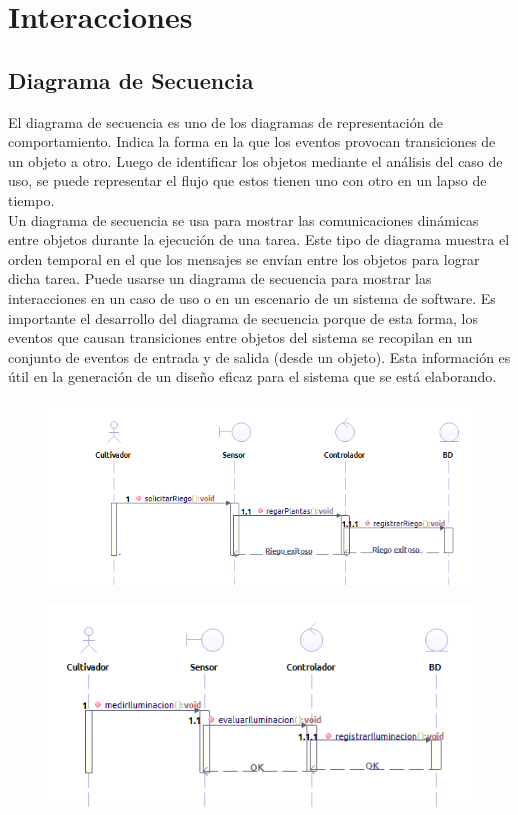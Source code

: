 \section{Interacciones}

\newpage

\subsection{Diagrama de Secuencia}
El diagrama de secuencia es uno de los diagramas de representación de comportamiento. Indica la forma en la que los eventos provocan transiciones de un objeto a otro. Luego de identificar los objetos mediante el análisis del caso de uso, se puede representar el flujo que estos tienen uno con otro en un lapso de tiempo.\\

Un diagrama de secuencia se usa para mostrar las comunicaciones dinámicas entre objetos durante la ejecución de una tarea. Este tipo de diagrama muestra el orden temporal en el que los mensajes se envían entre los objetos para lograr dicha tarea. Puede usarse un diagrama de secuencia para mostrar las interacciones en un caso de uso o en un escenario de un sistema de software.
Es importante el desarrollo del diagrama de secuencia porque de esta forma, los eventos que causan transiciones entre objetos del sistema se recopilan en un conjunto de eventos de entrada y de salida (desde un objeto). Esta información es útil en la generación de un diseño eficaz para el sistema que se está elaborando. \cite{bruegge2002ingenieria}

\begin{figure}[h!]
	\centering
	\includegraphics[width=1.2\linewidth]{proyecto/imgs/SecuenciaRiego}
	\caption{}
	\label{fig:secuenciariego}
\end{figure}

\begin{figure}[h!]
	\centering
	\includegraphics[width=1\linewidth]{proyecto/imgs/SecuenciaIluminacion}
	\caption{}
	\label{fig:secuenciailuminacion}
\end{figure}

